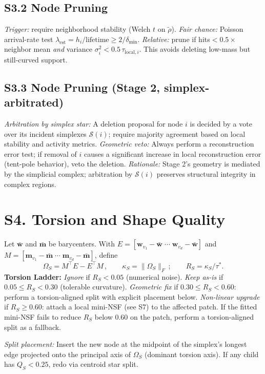 \documentclass[11pt]{article}
\begin{document}
\subsection*{S3.2 Node Pruning}
\emph{Trigger:} require neighborhood stability (Welch $t$ on $\tilde\rho$). \emph{Fair chance:} Poisson arrival-rate test $\lambda_{\mathrm{est}}=h_i/\text{lifetime} \ge 2/\delta_{\min}$. \emph{Relative:} prune if hits$<0.5\times$ neighbor mean \emph{and} variance $\sigma_i^2 < 0.5\,\tau_{\mathrm{local},i}$. This avoids deleting low-mass but still-curved support.

\subsection*{S3.3 Node Pruning (Stage 2, simplex-arbitrated)}
\emph{Arbitration by simplex star:} A deletion proposal for node $i$ is decided by a vote over its incident simplexes $\mathcal S(i)$; require majority agreement based on local stability and activity metrics. \emph{Geometric veto:} Always perform a reconstruction error test; if removal of $i$ causes a significant increase in local reconstruction error (tent-pole behavior), veto the deletion. \emph{Rationale:} Stage 2's geometry is mediated by the simplicial complex; arbitration by $\mathcal S(i)$ preserves structural integrity in complex regions.

\section*{S4. Torsion and Shape Quality}
Let $\bar{\mathbf w}$ and $\bar{\mathbf m}$ be barycenters. With $E=[\mathbf w_{v_1}{-}\bar{\mathbf w}\;\cdots\;\mathbf w_{v_d}{-}\bar{\mathbf w}]$ and $M=[\mathbf m_{v_1}{-}\bar{\mathbf m}\;\cdots\;\mathbf m_{v_d}{-}\bar{\mathbf m}]$, define
\[\Omega_S = M^{\top}E - E^{\top}M\,,\qquad \kappa_S = \lVert \Omega_S \rVert_F\,;\qquad R_S = \kappa_S/\tau^*.\]
\textbf{Torsion Ladder:} \emph{Ignore} if $R_S{<}0.05$ (numerical noise). \emph{Keep as-is} if $0.05\le R_S{<}0.30$ (tolerable curvature). \emph{Geometric fix} if $0.30\le R_S{<}0.60$: perform a torsion-aligned split with explicit placement below. \emph{Non-linear upgrade} if $R_S\ge 0.60$: attach a local mini-NSF (see S7) to the affected patch. If the fitted mini-NSF fails to reduce $R_S$ below $0.60$ on the patch, perform a torsion-aligned split as a fallback.

\emph{Split placement:} Insert the new node at the midpoint of the simplex's longest edge projected onto the principal axis of $\Omega_S$ (dominant torsion axis). If any child has $Q_S{<}0.25$, redo via centroid star split.
\end{document}
